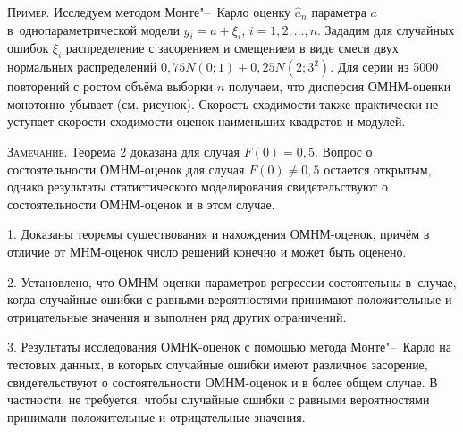 


\textsc{\small Пример.}
Исследуем методом Монте"--~Карло оценку ${\hat{a}}_{n}$ параметра $a$ в~однопараметрической модели ${y_{i}}={a}+\xi_{i}$, 
$ i= 1, 2, \ldots ,n.$
 Зададим для случайных ошибок $\xi_{i}$ распределение с засорением и смещением
в виде смеси двух нормальных распределений $0,75N(0;1) +
0,25N(2;3^{2})$. Для серии из 5000 повторений с ростом объёма
выборки $n$ получаем, что дисперсия ОМНМ-оценки монотонно убывает
(см. рисунок). Скорость сходимости также практически не уступает
скорости сходимости оценок наименьших квадратов и модулей.






\textsc{\small Замечание.} 
Теорема 2 доказана для случая $F(0)=0,5$. Вопрос о состоятельности ОМНМ-оценок для
случая $F(0) \neq 0,5$ остается открытым, однако результаты статистического моделирования
свидетельствуют о состоятельности ОМНМ-оценок и в этом случае.

\smallskip


1. Доказаны теоремы существования и нахождения ОМНМ-оценок,
причём в отличие от МНМ-оценок число решений конечно и может быть
оценено.

2. Установлено, что ОМНМ-оценки параметров регрессии состоятельны
в~случае, когда случайные ошибки с равными вероятностями принимают
положительные и отрицательные значения и выполнен ряд других
 ограничений.

3. Результаты исследования ОМНК-оценок с помощью метода
Монте"--~Карло на тестовых данных, в которых случайные ошибки имеют
различное засорение, свидетельствуют о состоятельности ОМНМ-оценок
и в более общем случае. В частности, не требуется, чтобы случайные
ошибки с равными вероятностями принимали положительные и
отрицательные значения.

